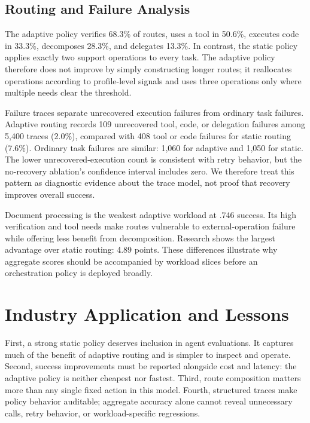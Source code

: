 \documentclass[sigconf]{acmart}
\begin{document}
\subsection{Routing and Failure Analysis}

The adaptive policy verifies 68.3\% of routes, uses a tool in 50.6\%, executes code in 33.3\%, decomposes 28.3\%, and delegates 13.3\%. In contrast, the static policy applies exactly two support operations to every task. The adaptive policy therefore does not improve by simply constructing longer routes; it reallocates operations according to profile-level signals and uses three operations only where multiple needs clear the threshold.

Failure traces separate unrecovered execution failures from ordinary task failures. Adaptive routing records 109 unrecovered tool, code, or delegation failures among 5,400 traces (2.0\%), compared with 408 tool or code failures for static routing (7.6\%). Ordinary task failures are similar: 1,060 for adaptive and 1,050 for static. The lower unrecovered-execution count is consistent with retry behavior, but the no-recovery ablation's confidence interval includes zero. We therefore treat this pattern as diagnostic evidence about the trace model, not proof that recovery improves overall success.

Document processing is the weakest adaptive workload at .746 success. Its high verification and tool needs make routes vulnerable to external-operation failure while offering less benefit from decomposition. Research shows the largest advantage over static routing: 4.89 points. These differences illustrate why aggregate scores should be accompanied by workload slices before an orchestration policy is deployed broadly.

\section{Industry Application and Lessons}

First, a strong static policy deserves inclusion in agent evaluations. It captures much of the benefit of adaptive routing and is simpler to inspect and operate. Second, success improvements must be reported alongside cost and latency: the adaptive policy is neither cheapest nor fastest. Third, route composition matters more than any single fixed action in this model. Fourth, structured traces make policy behavior auditable; aggregate accuracy alone cannot reveal unnecessary calls, retry behavior, or workload-specific regressions.
\end{document}
